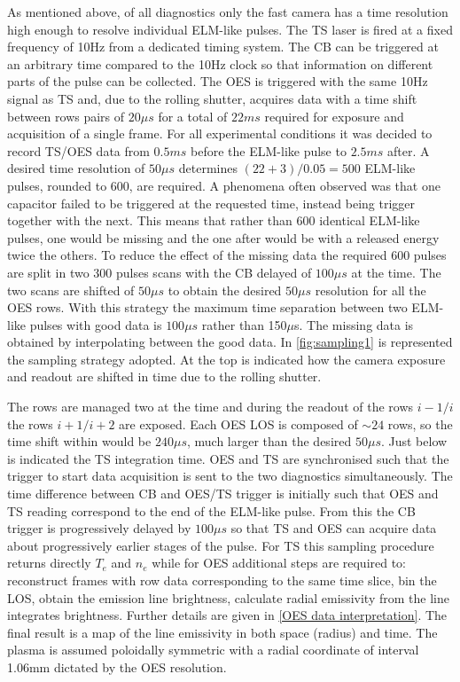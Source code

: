 As mentioned above, of all diagnostics only the fast camera has a time resolution high enough to resolve individual ELM-like pulses. The TS laser is fired at a fixed frequency of 10Hz from a dedicated timing system. The CB can be triggered at an arbitrary time compared to the 10Hz clock so that information on different parts of the pulse can be collected. The OES is triggered with the same 10Hz signal as TS and, due to the rolling shutter, acquires data with a time shift between rows pairs of $20\mu s$ for a total of $22ms$ required for exposure and acquisition of a single frame. For all experimental conditions it was decided to record TS/OES data from $0.5ms$ before the ELM-like pulse to $2.5ms$ after. A desired time resolution of $50\mu s$ determines $(22+3)/0.05=500$ ELM-like pulses, rounded to 600, are required. A phenomena often observed was that one capacitor failed to be triggered at the requested time, instead being trigger together with the next. This means that rather than 600 identical ELM-like pulses, one would be missing and the one after would be with a released energy twice the others. To reduce the effect of the missing data the required 600 pulses are split in two 300 pulses scans with the CB delayed of $100\mu s$ at the time. The two scans are shifted of $50\mu s$ to obtain the desired $50\mu s$ resolution for all the OES rows. With this strategy the maximum time separation between two ELM-like pulses with good data is $100\mu s$ rather than 150$\mu$s. The missing data is obtained by interpolating between the good data. In \autoref{fig:sampling1} is represented the sampling strategy adopted. At the top is indicated how the camera exposure and readout are shifted in time due to the rolling shutter. 

The rows are managed two at the time and during the readout of the rows $i-1/i$ the rows $i+1/i+2$ are exposed. Each OES LOS is composed of $\sim 24$ rows, so the time shift within would be $240\mu s$, much larger than the desired $50 \mu s$. Just below is indicated the TS integration time. OES and TS are synchronised such that the trigger to start data acquisition is sent to the two diagnostics simultaneously.
The time difference between CB and OES/TS trigger is initially such that OES and TS reading correspond to the end of the ELM-like pulse. From this the CB trigger is progressively delayed by $100\mu s$ so that TS and OES can acquire data about progressively earlier stages of the pulse.
For TS this sampling procedure returns directly $T_e$ and $n_e$ while for OES additional steps are required to: reconstruct frames with row data corresponding to the same time slice, bin the LOS, obtain the emission line brightness, calculate radial emissivity from the line integrates brightness. Further details are given in \autoref{OES data interpretation}. The final result is a map of the line emissivity in both space (radius) and time. The plasma is assumed poloidally symmetric with a radial coordinate of interval 1.06mm dictated by the OES resolution.

